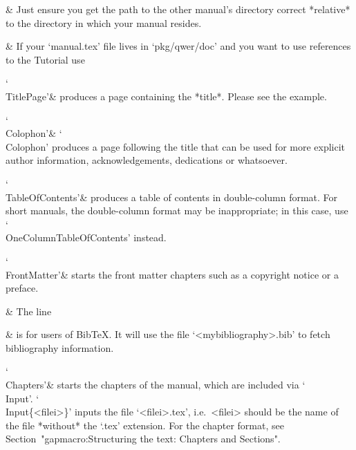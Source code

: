   &
Just ensure you get the  path  to  the
other manual's directory correct *relative* to  the  directory  in  which
your manual resides.

  &
If your `manual.tex' file lives in `pkg/qwer/doc' and  you  want  to  use
references to the {\GAP} Tutorial use

\begintt
{}
\endtt

\indextt{\\TitlePage}
`\\TitlePage'&
produces a page containing the *title*. Please see the example.

\indextt{\\Colophon}
`\\Colophon'&
`\\Colophon' produces a page following the title that  can  be  used  for
more  explicit  author  information,  acknowledgements,  dedications   or
whatsoever.

\indextt{\\TableOfContents}\indextt{\\OneColumnTableOfContents}
`\\TableOfContents'&
produces a table of contents in double-column format. For short  manuals,
the  double-column  format  may  be  inappropriate;  in  this  case,  use
`\\OneColumnTableOfContents' instead.

\indextt{\\FrontMatter}
`\\FrontMatter'&
starts the front matter chapters such as a copyright notice or a preface.

  &
The line

{}

  &
is for users of Bib{\TeX}. It will use the file `<mybibliography>.bib' to
fetch bibliography information.

\indextt{\\Chapters}
`\\Chapters'&
starts the chapters of the manual,  which  are  included  via  `\\Input'.
`\\Input\{<filei>\}' inputs the file `<filei>.tex',  i.e.~<filei>  should
be the name of the file *without* the `.tex' extension. For  the  chapter
format, see Section~"gapmacro:Structuring the text: Chapters and Sections".

